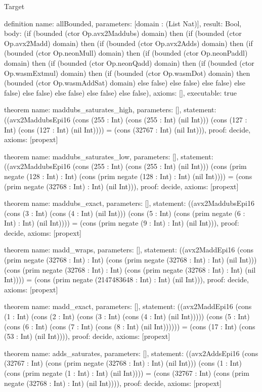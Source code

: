 \begin{lexlean}{Target}
\begin{semanticmodule}
definition{
  name: allBounded,
  parameters: [domain : (List Nat)],
  result: Bool,
  body: (if (bounded (ctor Op.avx2Maddubs) domain) then (if (bounded (ctor Op.avx2Madd) domain) then (if (bounded (ctor Op.avx2Adds) domain) then (if (bounded (ctor Op.neonMull) domain) then (if (bounded (ctor Op.neonPaddl) domain) then (if (bounded (ctor Op.neonQadd) domain) then (if (bounded (ctor Op.wasmExtmul) domain) then (if (bounded (ctor Op.wasmDot) domain) then (bounded (ctor Op.wasmAddSat) domain) else false) else false) else false) else false) else false) else false) else false) else false),
  axioms: [],
  executable: true
}

theorem{
  name: maddubs_saturates_high,
  parameters: [],
  statement: ((avx2MaddubsEpi16 (cons (255 : Int) (cons (255 : Int) (nil Int))) (cons (127 : Int) (cons (127 : Int) (nil Int)))) = (cons (32767 : Int) (nil Int))),
  proof: decide{},
  axioms: [propext]
}

theorem{
  name: maddubs_saturates_low,
  parameters: [],
  statement: ((avx2MaddubsEpi16 (cons (255 : Int) (cons (255 : Int) (nil Int))) (cons (prim negate (128 : Int) : Int) (cons (prim negate (128 : Int) : Int) (nil Int)))) = (cons (prim negate (32768 : Int) : Int) (nil Int))),
  proof: decide{},
  axioms: [propext]
}

theorem{
  name: maddubs_exact,
  parameters: [],
  statement: ((avx2MaddubsEpi16 (cons (3 : Int) (cons (4 : Int) (nil Int))) (cons (5 : Int) (cons (prim negate (6 : Int) : Int) (nil Int)))) = (cons (prim negate (9 : Int) : Int) (nil Int))),
  proof: decide{},
  axioms: [propext]
}

theorem{
  name: madd_wraps,
  parameters: [],
  statement: ((avx2MaddEpi16 (cons (prim negate (32768 : Int) : Int) (cons (prim negate (32768 : Int) : Int) (nil Int))) (cons (prim negate (32768 : Int) : Int) (cons (prim negate (32768 : Int) : Int) (nil Int)))) = (cons (prim negate (2147483648 : Int) : Int) (nil Int))),
  proof: decide{},
  axioms: [propext]
}

theorem{
  name: madd_exact,
  parameters: [],
  statement: ((avx2MaddEpi16 (cons (1 : Int) (cons (2 : Int) (cons (3 : Int) (cons (4 : Int) (nil Int))))) (cons (5 : Int) (cons (6 : Int) (cons (7 : Int) (cons (8 : Int) (nil Int)))))) = (cons (17 : Int) (cons (53 : Int) (nil Int)))),
  proof: decide{},
  axioms: [propext]
}

theorem{
  name: adds_saturates,
  parameters: [],
  statement: ((avx2AddsEpi16 (cons (32767 : Int) (cons (prim negate (32768 : Int) : Int) (nil Int))) (cons (1 : Int) (cons (prim negate (1 : Int) : Int) (nil Int)))) = (cons (32767 : Int) (cons (prim negate (32768 : Int) : Int) (nil Int)))),
  proof: decide{},
  axioms: [propext]
}


\end{semanticmodule}
\end{lexlean}
